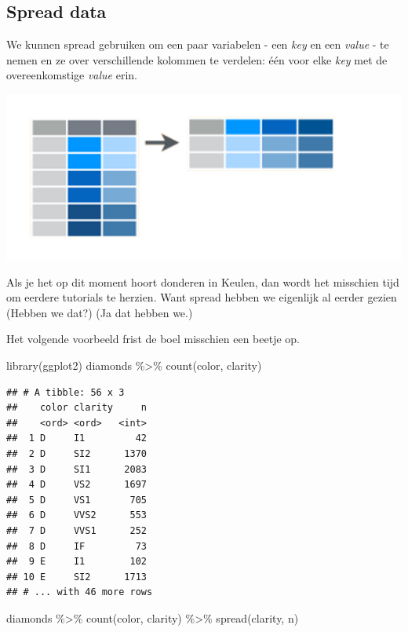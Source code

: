 \documentclass[]{tufte-book}
\newenvironment{Shaded}{}{}
\newcommand{\FunctionTok}[1]{\textcolor[rgb]{0.02,0.16,0.49}{#1}}
\newcommand{\NormalTok}[1]{#1}
\newcommand{\SpecialCharTok}[1]{\textcolor[rgb]{0.25,0.44,0.63}{#1}}
\begin{document}
\hypertarget{spread-data}{%
\subsection{Spread data}\label{spread-data}}

We kunnen spread gebruiken om een paar variabelen - een \emph{key} en een \emph{value} - te nemen en ze over verschillende kolommen te verdelen: één voor elke \emph{key} met de overeenkomstige \emph{value} erin.

\includegraphics[width=1\linewidth]{images/spread}

Als je het op dit moment hoort donderen in Keulen, dan wordt het misschien tijd om eerdere tutorials te herzien. Want spread hebben we eigenlijk al eerder gezien (Hebben we dat?) (Ja dat hebben we.)

Het volgende voorbeeld frist de boel misschien een beetje op.

\begin{Shaded}
\begin{Highlighting}[]
\FunctionTok{library}\NormalTok{(ggplot2)}
\NormalTok{diamonds }\SpecialCharTok{\%\textgreater{}\%}
  \FunctionTok{count}\NormalTok{(color, clarity)}
\end{Highlighting}
\end{Shaded}

\begin{verbatim}
## # A tibble: 56 x 3
##    color clarity     n
##    <ord> <ord>   <int>
##  1 D     I1         42
##  2 D     SI2      1370
##  3 D     SI1      2083
##  4 D     VS2      1697
##  5 D     VS1       705
##  6 D     VVS2      553
##  7 D     VVS1      252
##  8 D     IF         73
##  9 E     I1        102
## 10 E     SI2      1713
## # ... with 46 more rows
\end{verbatim}

\begin{Shaded}
\begin{Highlighting}[]
\NormalTok{diamonds }\SpecialCharTok{\%\textgreater{}\%}
  \FunctionTok{count}\NormalTok{(color, clarity) }\SpecialCharTok{\%\textgreater{}\%}
  \FunctionTok{spread}\NormalTok{(clarity, n)}
\end{Highlighting}
\end{Shaded}
\end{document}
